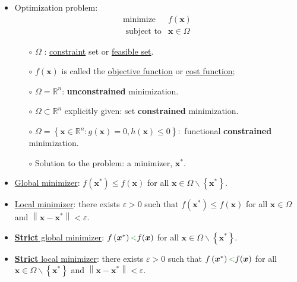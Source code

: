 \documentclass[12pt,thmsa]{article}
\begin{document}
\begin{itemize}
	\item Optimization problem:
	\[
		\begin{array}{rl}
			\operatorname{minimize} & f(\boldsymbol{x}) \\
			\text { subject to} & \boldsymbol{x} \in \Omega
		\end{array}
	\]
	\begin{itemize}
	\item[\(\circ\)] \(\Omega\) : \underline{constraint} set or \underline{feasible set}.
	
	\item[\(\circ\)]  \(f(\boldsymbol{x})\) is called the \underline{objective function} or \underline{cost function};

	\item[\(\circ\)]  \(\Omega=\mathbb{R}^n\): \textbf{unconstrained} minimization.
	
	\item[\(\circ\)]  \(\Omega \subset \mathbb{R}^n\) explicitly given: set \textbf{constrained} minimization.
	
	\item[\(\circ\)] \(\Omega=\left\{\boldsymbol{x} \in \mathbb{R}^n: g(\boldsymbol{x})=0, h(\boldsymbol{x}) \leq 0\right\}:\) functional \textbf{constrained} minimization.

	\item[\(\circ\)] Solution to the problem: a minimizer, \(\boldsymbol{x}^{*}\).
	
	\end{itemize}

	
	\item \underline{Global minimizer}: \(f\left(\boldsymbol{x}^{*}\right) \leq f(\boldsymbol{x})\) for all \(\boldsymbol{x} \in \Omega \backslash\left\{\boldsymbol{x}^{*}\right\}\).
	
	\item \underline{Local minimizer}: there exists \(\varepsilon>0\) such that \(f\left(\boldsymbol{x}^{*}\right) \leq f(\boldsymbol{x})\) for all \(\boldsymbol{x} \in \Omega \) and \(\left\|\boldsymbol{x}-\boldsymbol{x}^{*}\right\|<\varepsilon\).
	
	\item \underline{\textbf{Strict} global minimizer}: \(f\left(\boldsymbol{x}^{*}\right) {\color{forestgreen}<} f(\boldsymbol{x})\) for all \(\boldsymbol{x} \in \Omega \backslash\left\{\boldsymbol{x}^{*}\right\}\).

	\item \underline{\textbf{Strict} local minimizer}: there exists \(\varepsilon>0\) such that \(f\left(\boldsymbol{x}^{*}\right) {\color{forestgreen}<} f(\boldsymbol{x})\) for all \(\boldsymbol{x} \in \Omega \backslash\left\{\boldsymbol{x}^{*}\right\}\) and \(\left\|\boldsymbol{x}-\boldsymbol{x}^{*}\right\|<\varepsilon\).
	
\end{itemize}
\end{document}
